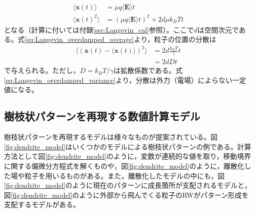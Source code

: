 \documentclass[autodetect-engine,dvi=dvipdfmx,a4paper,ja=standard,oneside,openany]{bxjsbook}
\begin{document}
\begin{equation}
  \begin{split}
    \langle\bm{x}(t)\rangle   & =\mu q\langle\bm{E}\rangle t                    \\
    \langle\bm{x}(t)^2\rangle & =(\mu q \langle\bm{E}\rangle t)^2+2d\mu k_B T t
  \end{split}
  \label{eq:Langevin_overdamped_average}
\end{equation}
となる（計算に付いては付録\ref{sec:Langevin_cal}参照）。ここで$d$は空間次元である。式\eqref{eq:Langevin_overdamped_average}より，粒子の位置の分散は
\begin{equation}
  \begin{split}
    \langle(\bm{x}(t)-\langle\bm{x}(t)\rangle)^2\rangle & =2d \frac{k_B T}{\gamma} t \\
                                                        & =2dDt
  \end{split}
  \label{eq:Langevin_overdamped_variance}
\end{equation}
で与えられる。ただし，$D=k_B T/\gamma$は拡散係数である。式\eqref{eq:Langevin_overdamped_variance}より，分散は外力（電場）によらない一定値になる。

\subsection{樹枝状パターンを再現する数値計算モデル}
樹枝状パターンを再現するモデルは様々なものが提案されている。図\ref{fig:dendrite_model}はいくつかのモデルによる樹枝状パターンの例である。計算方法として図\ref{fig:dendrite_model}のように，変数が連続的な値を取り，移動境界に関する偏微分方程式を解くものや，図\ref{fig:dendrite_model}のように，離散化した場や粒子を用いるものがある。また，離散化したモデルの中にも，図\ref{fig:dendrite_model}のように現在のパターンに成長箇所が支配されるモデルと，図\ref{fig:dendrite_model}のように外部から飛んでくる粒子のRWがパターン形成を支配するモデルがある。
\end{document}
